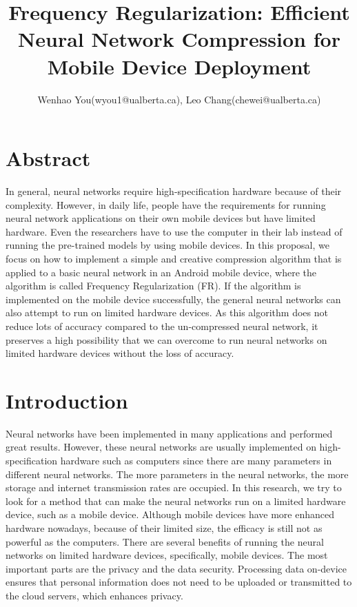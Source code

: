 \documentclass{article}
\title{Frequency Regularization: Efficient Neural Network Compression for Mobile Device Deployment}
\author{Wenhao You(wyou1@ualberta.ca), Leo Chang(chewei@ualberta.ca)}
\date{}
\begin{document}
	\maketitle
	
	\section*{Abstract}

In general, neural networks require high-specification hardware because of their complexity. However, in daily life, people have the requirements for running neural network applications on their own mobile devices but have limited hardware. Even the researchers have to use the computer in their lab instead of running the pre-trained models by using mobile devices. In this proposal, we focus on how to implement a simple and creative compression algorithm that is applied to a basic neural network in an Android mobile device, where the algorithm is called Frequency Regularization (FR). If the algorithm is implemented on the mobile device successfully, the general neural networks can also attempt to run on limited hardware devices. As this algorithm does not reduce lots of accuracy compared to the un-compressed neural network, it preserves a high possibility that we can overcome to run neural networks on limited hardware devices without the loss of accuracy.



	\section*{Introduction}
	
Neural networks have been implemented in many applications and performed great results. However, these neural networks are usually implemented on high-specification hardware such as computers since there are many parameters in different neural networks. The more parameters in the neural networks, the more storage and internet transmission rates are occupied. In this research, we try to look for a method that can make the neural networks run on a limited hardware device, such as a mobile device. Although mobile devices have more enhanced hardware nowadays, because of their limited size, the efficacy is still not as powerful as the computers. There are several benefits of running the neural networks on limited hardware devices, specifically, mobile devices. The most important parts are the privacy and the data security. Processing data on-device ensures that personal information does not need to be uploaded or transmitted to the cloud servers, which enhances privacy. 
\end{document}

